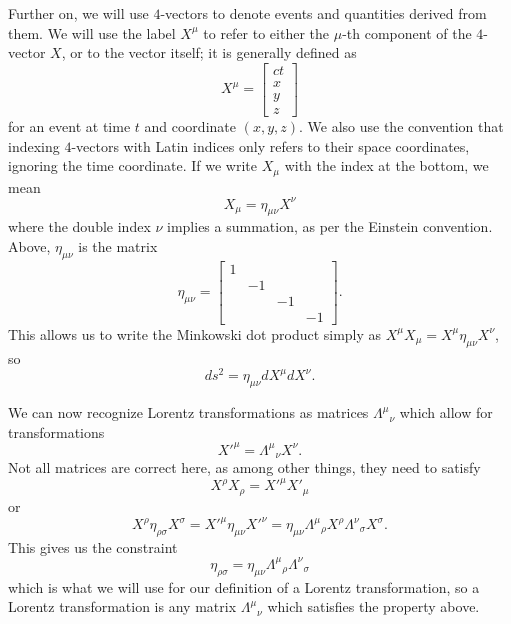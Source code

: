 
Further on, we will use $4$-vectors to denote events and quantities derived from
them.
We will use the label $X^\mu$ to refer to either the $\mu$-th component of the
$4$-vector $X$, or to the vector itself; it is generally defined as
\[
  X^\mu =
  \begin{bmatrix}
	ct \\ x \\ y \\ z
  \end{bmatrix}
\]
for an event at time $t$ and coordinate $(x, y, z)$.
We also use the convention that indexing $4$-vectors with Latin indices only
refers to their space coordinates, ignoring the time coordinate.
If we write $X_\mu$ with the index at the bottom, we mean
\[
  X_\mu = \eta_{\mu \nu} X^\nu
\]
where the double index $\nu$ implies a summation, as per the Einstein
convention.
Above, $\eta_{\mu \nu}$ is the matrix
\[
  \eta_{\mu \nu} =
  \begin{bmatrix}
	1 & & & \\ & -1 & & \\ & & -1 & \\ & & & -1
  \end{bmatrix}.
\]
This allows us to write the Minkowski dot product simply as $X^\mu X_\mu = X^\mu
\eta_{\mu \nu} X^\nu$, so
\[
  ds^2 = \eta_{\mu \nu} dX^\mu dX^\nu.
\]

We can now recognize Lorentz transformations as matrices ${\Lambda^\mu}_\nu$
which allow for transformations
\[
  X'^\mu = {\Lambda^\mu}_\nu X^\nu.
\]
Not all matrices are correct here, as among other things, they need to satisfy
\[
  X^\rho X_\rho
  = X'^\mu X'_\mu
\]
or
\[
  X^\rho \eta_{\rho \sigma} X^\sigma
  = X'^\mu \eta_{\mu \nu} X'^\nu
  = \eta_{\mu \nu} {\Lambda^\mu}_\rho X^\rho {\Lambda^\nu}_\sigma X^\sigma.
\]
This gives us the constraint
\[
  \eta_{\rho \sigma} = \eta_{\mu \nu} {\Lambda^\mu}_\rho {\Lambda^\nu}_\sigma
\]
which is what we will use for our definition of a Lorentz transformation, so a
Lorentz transformation is any matrix ${\Lambda^\mu}_\nu$ which satisfies the
property above.

